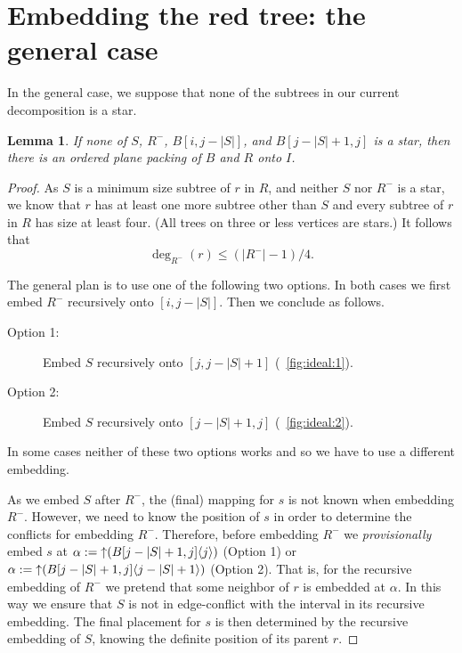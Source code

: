 \documentclass[11pt,a4paper,colorlinks=true,urlcolor=blue,citecolor=red]{article}
\theoremstyle{plain}
\newtheorem{lemma}[theorem]{Lemma}
\begin{document}
\section{Embedding the red tree: the general case}
\label{subsec:rec_general}
In the general case, we suppose that none of the subtrees in our current
decomposition is a star.
\begin{lemma}\label{lem:rec_general}
  If none of $S$, $R^-$, $B[i,j-|S|]$, and $B[j-|S|+1,j]$ is a star,
  then there is an ordered plane packing of $B$ and $R$ onto $I$.
\end{lemma}
\begin{proof}
  As $S$ is a minimum size subtree of $r$ in $R$, and neither $S$ nor
  $R^-$ is a star, we know that $r$ has at least one more subtree other
  than $S$ and every subtree of $r$ in $R$ has size at least four. (All
  trees on three or less vertices are stars.) It follows that
\begin{equation}\label{eq:degr}
    \deg_{R^-}(r)\le(|R^-|-1)/4.
  \end{equation}


  The general plan is to use one of the following two options. In both
  cases we first embed $R^-$ recursively onto $[i,j-|S|]$. Then we
  conclude as follows.
  \begin{description}
  \item[Option 1:] Embed $S$ recursively onto $[j,j-|S|+1]$
    (\figurename~\ref{fig:ideal:1}).
  \item[Option 2:] Embed $S$ recursively onto $[j-|S|+1,j]$
    (\figurename~\ref{fig:ideal:2}).
  \end{description}
  In some cases neither of these two options works and so we have to use
  a different embedding.

  As we embed $S$ after $R^-$, the (final) mapping for $s$ is not known
  when embedding $R^-$. However, we need to know the position of $s$ in
  order to determine the conflicts for embedding $R^-$. Therefore,
  before embedding $R^-$ we \emph{provisionally} embed $s$ at
  $\alpha:=\mathop{\uparrow}(B{[j-|S|+1,j]}\langle{j}\rangle)$ (Option 1) or
  $\alpha:=\mathop{\uparrow}(B{[j-|S|+1,j]}\langle{j-|S|+1}\rangle)$ (Option 2).  That
  is, for the recursive embedding of $R^-$ we pretend that some neighbor
  of $r$ is embedded at $\alpha$. In this way we ensure that $S$ is not
  in edge-conflict with the interval in its recursive embedding.
The final placement for $s$ is then determined by the recursive
  embedding of $S$, knowing the definite position of its parent $r$.


\end{proof}
\end{document}
